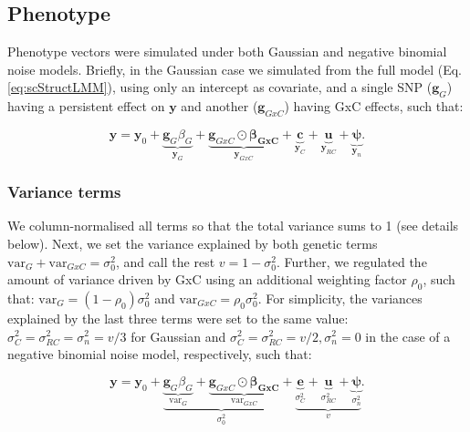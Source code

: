\subsection{Phenotype}

Phenotype vectors were simulated under both Gaussian and negative binomial noise models. 
Briefly, in the Gaussian case we simulated from the full model (Eq.\eqref{eq:scStructLMM}), using only an intercept as covariate, and a single SNP ($\mathbf{g}_G$) having a persistent effect on $\mathbf{y}$ and another ($\mathbf{g}_{GxC}$) having GxC effects, such that:  

\begin{equation}\label{eq:simulated_pheno}
 \mathbf{y} = \mathbf{y}_0 + \underbrace{\mathbf{g}_G\beta_G}_{\mathbf{y}_G} + \underbrace{\mathbf{g}_{GxC} \odot \boldsymbol{\beta_{GxC}}}_{\mathbf{y}_{GxC}} + \underbrace{\mathbf{c}}_{\mathbf{y}_C} + \underbrace{\mathbf{u}}_{\mathbf{y}_{RC}} + \underbrace{\boldsymbol{\psi}}_{\mathbf{y}_n}. 
\end{equation}


\subsubsection{Variance terms}\label{sec:variances}

We column-normalised all terms so that the total variance sums to 1 (see details below). Next, we set the variance explained by both genetic terms $\mathrm{var}_G+\mathrm{var}_{GxC}=\sigma_0^2$, and call the rest $v = 1-\sigma_0^2$.
Further, we regulated the amount of variance driven by GxC using an additional weighting factor $\rho_0$, such that: $\mathrm{var}_G = (1-\rho_0)\sigma_0^2$ and $\mathrm{var}_{GxC} = \rho_0\sigma_0^2$.
For simplicity, the variances explained by the last three terms were set to the same value:
$\sigma_C^2 = \sigma_{RC}^2 = \sigma_n^2 = v/3$ for Gaussian and $\sigma_C^2 = \sigma_{RC}^2 = v/2, \sigma_n^2 = 0$ in the case of a negative binomial noise model, respectively, such that:

\begin{equation}\label{eq:variances}
 \mathbf{y} = \mathbf{y}_0 + \underbrace{\underbrace{\mathbf{g}_G\beta_G}_{\mathrm{var}_G} + \underbrace{\mathbf{g}_{GxC} \odot \boldsymbol{\beta_{GxC}}}_{\mathrm{var}_{GxC}}}_{\sigma_0^2} + \underbrace{\underbrace{\mathbf{e}}_{\sigma_C^2} + \underbrace{\mathbf{u}}_{\sigma_{RC}^2} + \underbrace{\boldsymbol{\psi}}_{\sigma_n^2}}_{v}. 
\end{equation}

